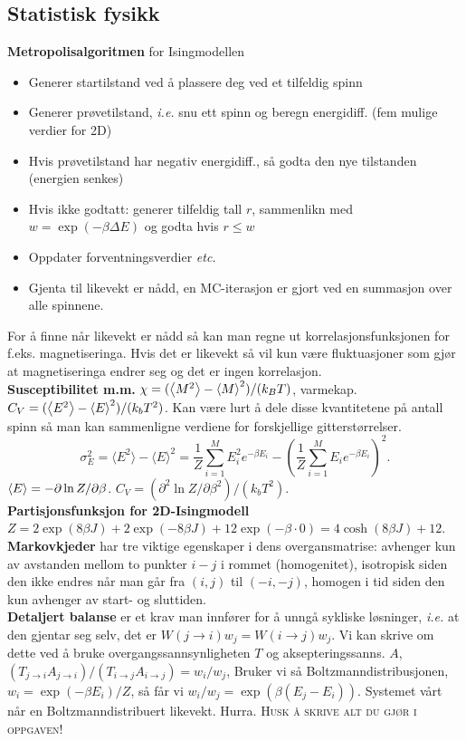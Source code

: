 \documentclass[12pt,a4paper,twocolumn]{article}
\begin{document}
\begin{flushleft}
\subsection{Statistisk fysikk} %
\label{sub:statistisk_fysikk}
\textbf{Metropolisalgoritmen} for Isingmodellen
\begin{itemize}
  \item Generer startilstand ved å plassere deg ved et tilfeldig spinn
  \item Generer prøvetilstand, \emph{i.e.} snu ett spinn og beregn energidiff. (fem mulige verdier for 2D)
  \item Hvis prøvetilstand har negativ energidiff., så godta den nye tilstanden (energien senkes)
  \item Hvis ikke godtatt: generer tilfeldig tall $r$, sammenlikn med $w=\exp(-\beta\Delta E)$ og godta hvis $r\leq w$
  \item Oppdater forventningsverdier \emph{etc.}
  \item Gjenta til likevekt er nådd, en MC-iterasjon er gjort ved en summasjon over alle spinnene.
\end{itemize}
For å finne når likevekt er nådd så kan man regne ut korrelasjonsfunksjonen for f.eks. magnetiseringa. Hvis det er likevekt så vil kun være fluktuasjoner som gjør at magnetiseringa endrer seg og det er ingen korrelasjon.\\
\textbf{Susceptibilitet m.m.} $\chi = (\left< M^2 \right> - \left< M \right>^2)/(k_B T)$, varmekap. $C_V = (\left< E^2 \right> - \left< E \right>^2)/(k_b T^2)$. Kan være lurt å dele disse kvantitetene på antall spinn så man kan sammenligne verdiene for forskjellige gitterstørrelser.
\begin{equation*}
\sigma_E^2=\langle E^2 \rangle-\langle E \rangle^2=
         \frac{1}{Z}\sum_{i=1}^M E_i^2e^{-\beta E_i}-
          \left(\frac{1}{Z}\sum_{i=1}^M E_ie^{-\beta E_i}\right)^2.
\end{equation*}
$\left< E \right> = -\partial \ln Z /\partial \beta$. $C_V = (\partial^2 \ln Z/\partial\beta^2)/(k_b T^2)$.\\
\textbf{Partisjonsfunksjon for 2D-Isingmodell} $Z = 2\exp(8\beta J) + 2\exp(-8\beta J) + 12\exp(-\beta\cdot0) = 4\cosh(8\beta J) + 12$.\\
\textbf{Markovkjeder} har tre viktige egenskaper i dens overgansmatrise: avhenger kun av avstanden mellom to punkter $i-j$ i rommet (homogenitet), isotropisk siden den ikke endres når man går fra $(i,j)$ til $(-i,-j)$, homogen i tid siden den kun avhenger av start- og sluttiden.\\
\textbf{Detaljert balanse} er et krav man innfører for å unngå sykliske løsninger, \emph{i.e.} at den gjentar seg selv, det er $W(j\to i)w_j=W(i\to j)w_j$. Vi kan skrive om dette ved å bruke overgangssannsynligheten $T$ og aksepteringssanns. $A$, $(T_{j\to i}A_{j\to i})/(T_{i\to j}A_{i\to j}) = w_i/w_j$, Bruker vi så Boltzmanndistribusjonen, $w_i = \exp(-\beta E_i)/Z$, så får vi $w_i/w_j = \exp(\beta(E_j-E_i))$. Systemet vårt når en Boltzmanndistribuert likevekt. Hurra.
\textsc{\large Husk å skrive alt du gjør i oppgaven!}

\end{flushleft}
\end{document}

